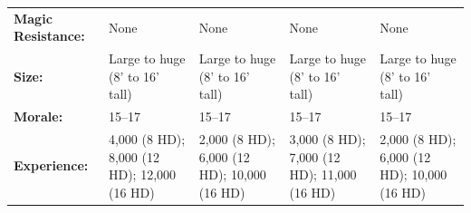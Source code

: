\begin{minipage}{\columnwidth}
\begin{tabular}{p{}g{.17\columnwidth}p{.17\columnwidth}g{.17\columnwidth}p{.17\columnwidth}}
\textbf{Magic Resistance:} 	& None	& None	& None	& None \\
\textbf{Size:} 				& Large to huge (8' to 16' tall)	& Large to huge (8' to 16' tall)	& Large to huge (8' to 16' tall)	& Large to huge (8' to 16' tall) \\
\textbf{Morale:} 			& 15--17	& 15--17	& 15--17	& 15--17 \\
\textbf{Experience:} 		& 4,000 (8 HD); 8,000 (12 HD); 12,000 (16 HD)	& 2,000 (8 HD); 6,000 (12 HD); 10,000 (16 HD)	& 3,000 (8 HD); 7,000 (12 HD); 11,000 (16 HD)	& 2,000 (8 HD); 6,000 (12 HD); 10,000 (16 HD) \\ %
\end{tabular}

\end{minipage}

